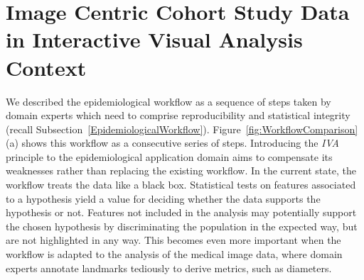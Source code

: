 \documentclass[journal]{style/vgtc} 			          %
\begin{document}
\section{Image Centric Cohort Study Data in Interactive Visual Analysis Context} \label{Image Centric Cohort Study Data in Interactive Visual Analysis Context}
We described the epidemiological workflow as a sequence of steps taken by domain experts which need to comprise reproducibility and statistical integrity (recall Subsection~\ref{EpidemiologicalWorkflow}).
%
Figure~\ref{fig:WorkflowComparison} (a) shows this workflow as a consecutive series of steps.
%
Introducing the \emph{IVA} principle to the epidemiological application domain aims to compensate its weaknesses rather than replacing the existing workflow.
%
In the current state, the workflow treats the data like a black box.
%
Statistical tests on features associated to a hypothesis yield a value for deciding whether the data supports the hypothesis or not.
%
%
Features not included in the analysis may potentially support the chosen hypothesis by discriminating the population in the expected way, but are not highlighted in any way.
%
This becomes even more important when the workflow is adapted to the analysis of the medical image data, where
domain experts annotate landmarks tediously to derive metrics, such as diameters. %
\end{document}
